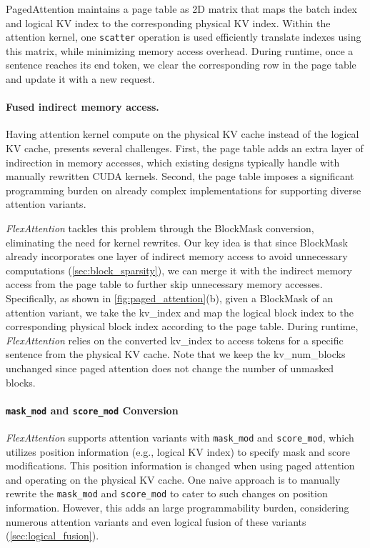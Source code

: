 PagedAttention maintains a page table as 2D matrix that maps the batch index and logical KV index to the corresponding physical KV index. Within the attention kernel, one  \texttt{scatter} operation is used efficiently translate indexes using this matrix, while minimizing memory access overhead. During runtime, once a sentence reaches its end token, we clear the corresponding row in the page table and update it with a new request.


\paragraph{Fused indirect memory access.}
Having attention kernel compute on the physical KV cache instead of the logical KV cache, presents several challenges.
First, the page table adds an extra layer of indirection in memory accesses, which existing designs typically handle with manually rewritten CUDA kernels.
Second, the page table imposes a significant programming burden on already complex implementations for supporting diverse attention variants.

\textit{FlexAttention} tackles this problem through the BlockMask conversion, eliminating the need for kernel rewrites.
Our key idea is that since BlockMask already incorporates one layer of indirect memory access to avoid unnecessary computations (\autoref{sec:block_sparsity}), we can merge it with the indirect memory access from the page table to further skip unnecessary memory accesses.
Specifically, as shown in \autoref{fig:paged_attention}(b), given a BlockMask of an attention variant, we take the kv\_index and map the logical block index to the corresponding physical block index according to the page table.
During runtime, \textit{FlexAttention} relies on the converted kv\_index to access tokens for a specific sentence from the physical KV cache.
Note that we keep the kv\_num\_blocks unchanged since paged attention does not change the number of unmasked blocks.



\paragraph{\texttt{mask\_mod} and \texttt{score\_mod} Conversion}
\textit{FlexAttention} supports attention variants with \texttt{mask\_mod} and \texttt{score\_mod}, which utilizes position information (e.g., logical KV index) to specify mask and score modifications.
This position information is changed when using paged attention and operating on the physical KV cache.
One naive approach is to manually rewrite the \texttt{mask\_mod} and \texttt{score\_mod} to cater to such changes on position information.
However, this adds an large programmability burden, considering numerous attention variants and even logical fusion of these variants (\autoref{sec:logical_fusion}).

